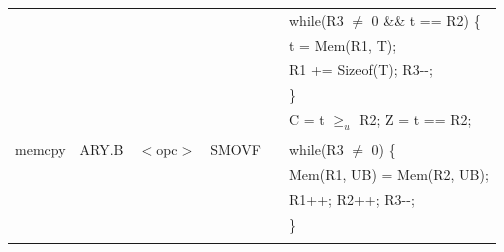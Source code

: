 \begin{table}
\begin{subtable}{\linewidth}
\begin{center}
\begin{tabular}{llllll}
                   &                   &                                       &                   &                   & while(R3 $\ne$ 0 \&\& t == R2) \{                                             \\
                   &                   &                                       &                   &                   & \quad t = Mem(R1, T);                                                         \\
                   &                   &                                       &                   &                   & \quad R1 += Sizeof(T); R3-{}-;                                                \\
                   &                   &                                       &                   &                   & \}                                                                            \\
                   &                   &                                       &                   &                   & C = t $\ge_u$ R2; Z = t == R2;                                                \\
                   &                   &                                       &                   &                   &                                                                               \\
memcpy             & ARY.B             & $<$opc$>$                             & SMOVF             & \flags{----}      & while(R3 $\ne$ 0) \{                                                          \\
                   &                   &                                       &                   &                   & \quad Mem(R1, UB) = Mem(R2, UB);                                              \\
                   &                   &                                       &                   &                   & \quad R1++; R2++; R3-{}-;                                                     \\
                   &                   &                                       &                   &                   & \}                                                                            \\
                   &                   &                                       &                   &                   &                                                                               \\

\end{tabular}
\end{center}
\end{subtable}
\end{table}
